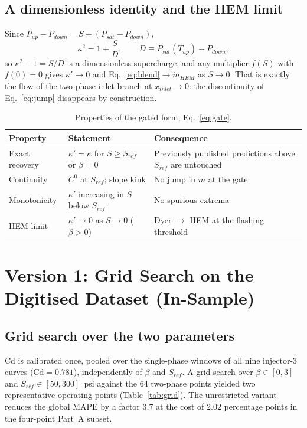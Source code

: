 \documentclass[11pt,a4paper]{article}
\newcommand{\mdot}{\dot m}
\begin{document}
\subsection{A dimensionless identity and the HEM limit}\label{sec:identity}
Since $P_{up}-P_{down}=S+(P_{sat}-P_{down})$,
\begin{equation}
\kappa^2=1+\frac{S}{D},\qquad D\equiv P_{sat}(T_{up})-P_{down},
\label{eq:identity}
\end{equation}
so $\kappa^2-1=S/D$ is a dimensionless supercharge, and any multiplier $f(S)$ with $f(0)=0$ gives $\kappa'\to0$ and Eq.~\eqref{eq:blend}$\to\mdot_{HEM}$ as $S\to0$. That is exactly the flow of the two-phase-inlet branch at $x_{inlet}\to0$: the discontinuity of Eq.~\eqref{eq:jump} disappears by construction.

\begin{table}[!htbp]
\centering\small
\caption{Properties of the gated form, Eq.~\eqref{eq:gate}.}
\label{tab:props}
\begin{tabular}{p{2.8cm}p{6.0cm}p{5.9cm}}\toprule
Property & Statement & Consequence\\\midrule
Exact recovery & $\kappa'=\kappa$ for $S\geq S_{ref}$ or $\beta=0$ & Previously published predictions above $S_{ref}$ are untouched\\
Continuity & $C^0$ at $S_{ref}$; slope kink & No jump in $\mdot$ at the gate\\
Monotonicity & $\kappa'$ increasing in $S$ below $S_{ref}$ & No spurious extrema\\
HEM limit & $\kappa'\to0$ as $S\to0$ ($\beta>0$) & Dyer $\to$ HEM at the flashing threshold\\\bottomrule
\end{tabular}
\end{table}

\section{Version 1: Grid Search on the Digitised Dataset (In-Sample)}\label{sec:v1}
\subsection{Grid search over the two parameters}
Cd is calibrated once, pooled over the single-phase windows of all nine injector-3 curves ($\mathrm{Cd}=0.781$), independently of $\beta$ and $S_{ref}$. A grid search over $\beta\in[0,3]$ and $S_{ref}\in[50,300]$~psi against the 64 two-phase points yielded two representative operating points (Table~\ref{tab:grid}). The unrestricted variant reduces the global MAPE by a factor 3.7 at the cost of 2.02 percentage points in the four-point Part~A subset.
\end{document}
